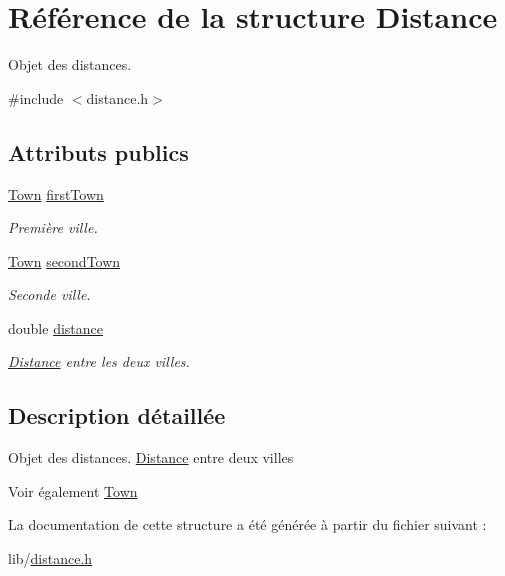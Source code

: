 \hypertarget{structDistance}{
\section{Référence de la structure Distance}
\label{structDistance}
}


Objet des distances.  




{\ttfamily \#include $<$distance.h$>$}

\subsection*{Attributs publics}
\begin{DoxyCompactItemize}
\item 
\hypertarget{structDistance_a619a6ef491d8538423e056dda49b72d2}{
\hyperlink{structTown}{Town} \hyperlink{structDistance_a619a6ef491d8538423e056dda49b72d2}{firstTown}}
\label{structDistance_a619a6ef491d8538423e056dda49b72d2}

\begin{DoxyCompactList}\small\item\em Première ville. \item\end{DoxyCompactList}\item 
\hypertarget{structDistance_aed7e33174b78e759a6be730017bc60ab}{
\hyperlink{structTown}{Town} \hyperlink{structDistance_aed7e33174b78e759a6be730017bc60ab}{secondTown}}
\label{structDistance_aed7e33174b78e759a6be730017bc60ab}

\begin{DoxyCompactList}\small\item\em Seconde ville. \item\end{DoxyCompactList}\item 
\hypertarget{structDistance_a6cd9b7d2a0b38abc488a875aee005538}{
double \hyperlink{structDistance_a6cd9b7d2a0b38abc488a875aee005538}{distance}}
\label{structDistance_a6cd9b7d2a0b38abc488a875aee005538}

\begin{DoxyCompactList}\small\item\em \hyperlink{structDistance}{Distance} entre les deux villes. \item\end{DoxyCompactList}\end{DoxyCompactItemize}


\subsection{Description détaillée}
Objet des distances. \hyperlink{structDistance}{Distance} entre deux villes \begin{DoxySeeAlso}{Voir également}
\hyperlink{structTown}{Town} 
\end{DoxySeeAlso}


La documentation de cette structure a été générée à partir du fichier suivant :\begin{DoxyCompactItemize}
\item 
lib/\hyperlink{distance_8h}{distance.h}\end{DoxyCompactItemize}
